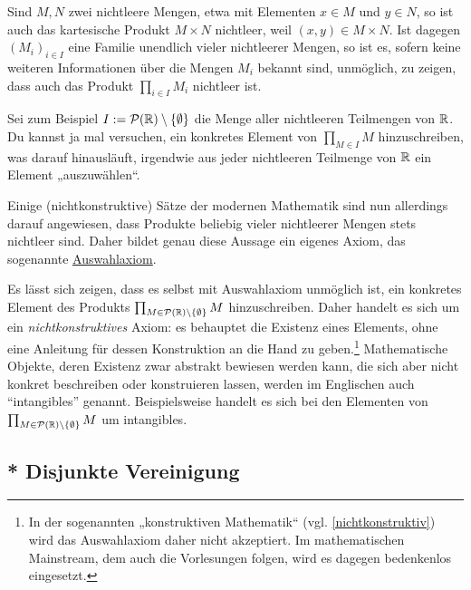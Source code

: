 \begin{vorschau}[* Auswahlaxiom] \label{auswahlaxiom}  
    Sind $M,N$ zwei nichtleere Mengen, etwa mit Elementen $x\in M$ und $y\in N$, so ist auch das kartesische Produkt $M\times N$ nichtleer, weil $(x,y)\in M\times N$. Ist dagegen $(M_i)_{i\in I}$ eine Familie unendlich vieler nichtleerer Mengen, so ist es, sofern keine weiteren Informationen über die Mengen $M_i$ bekannt sind, unmöglich, zu zeigen, dass auch das Produkt $\prod_{i\in I} M_i$ nichtleer ist.

    Sei zum Beispiel $I:= \mathcal P(\mathbb R)\setminus \{\emptyset\}$ die Menge aller nichtleeren Teilmengen von $\mathbb R$. Du kannst ja mal versuchen, ein konkretes Element von $\prod_{M\in I} M$ hinzuschreiben, was darauf hinausläuft, irgendwie aus jeder nichtleeren Teilmenge von $\mathbb R$ ein Element „auszuwählen“.

    Einige (nichtkonstruktive) Sätze der modernen Mathematik sind nun allerdings darauf angewiesen, dass Produkte beliebig vieler nichtleerer Mengen stets nichtleer sind. Daher bildet genau diese Aussage ein eigenes Axiom, das sogenannte \href{https://en.wikipedia.org/wiki/Axiom_of_choice}{Auswahlaxiom}.

    Es lässt sich zeigen, dass es selbst mit Auswahlaxiom unmöglich ist, ein konkretes Element des Produkts $\prod_{M\in \mathcal P(\mathbb R)\setminus \{\emptyset\}} M$ hinzuschreiben. Daher handelt es sich um ein \emph{nichtkonstruktives} Axiom: es behauptet die Existenz eines Elements, ohne eine Anleitung für dessen Konstruktion an die Hand zu geben.\footnote{In der sogenannten „konstruktiven Mathematik“ (vgl. \cref{nichtkonstruktiv}) wird das Auswahlaxiom daher nicht akzeptiert. Im mathematischen Mainstream, dem auch die Vorlesungen folgen, wird es dagegen bedenkenlos eingesetzt.} Mathematische Objekte, deren Existenz zwar abstrakt bewiesen werden kann, die sich aber nicht konkret beschreiben oder konstruieren lassen, werden im Englischen auch ``intangibles'' genannt. Beispielsweise handelt es sich bei den Elementen von $\prod_{M\in \mathcal P(\mathbb R)\setminus \{\emptyset\}} M$ um intangibles.
\end{vorschau}





\subsection*{* Disjunkte Vereinigung}


